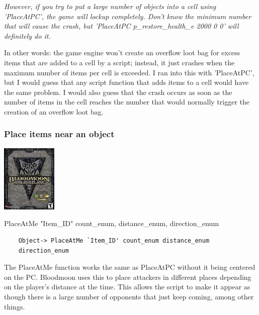 \emph{\hfill\break
However, if you try to put a large number of objects into a cell using
'PlaceAtPC', the game will lockup completely. Don't know the minimum
number that will cause the crash, but 'PlaceAtPC p\_restore\_health\_e
2000 0 0' will definitely do it.}%

In other words: the game engine won't create an overflow loot bag for
excess items that are added to a cell by a script; instead, it just
crashes when the maximum number of items per cell is exceeded. I ran
into this with 'PlaceAtPC', but I would guess that any script function
that adds items to a cell would have the same problem. I would also
guess that the crash occurs as soon as the number of items in the cell
reaches the number that would normally trigger the creation of an
overflow loot bag.

\hypertarget{place-items-near-an-object}{%
\subsubsection{Place items near an
object}\label{place-items-near-an-object}}

\includegraphics{media/image7.png}

PlaceAtMe "Item\_ID" count\_enum, distance\_enum, direction\_enum

\begin{lstlisting}
	Object-> PlaceAtMe `Item_ID' count_enum distance_enum
	direction_enum
\end{lstlisting}

The PlaceAtMe function works the same as PlaceAtPC without it being
centered on the PC. Bloodmoon uses this to place attackers in different
places depending on the player's distance at the time. This allows the
script to make it appear as though there is a large number of opponents
that just keep coming, among other things.

